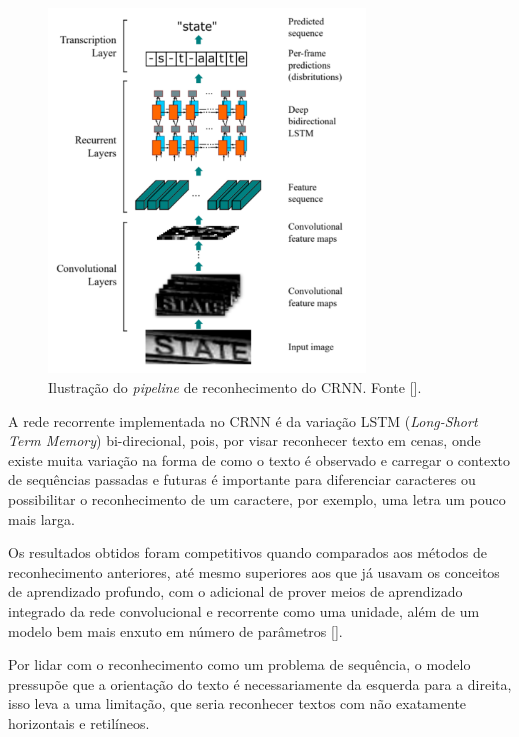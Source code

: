 \begin{figure}
    \centering
    \includegraphics[width=0.75\textwidth]{figs/crnn-pipeline.png}
    \caption{Ilustração do \textit{pipeline} de reconhecimento do CRNN. Fonte [].}
    \label{fig:crnn_pipeline}
\end{figure}

A rede recorrente implementada no CRNN é da variação LSTM (\textit{Long-Short Term Memory}) bi-direcional, pois, por visar reconhecer texto em cenas, 
onde existe muita variação na forma de como o texto é observado e carregar o contexto de sequências passadas e futuras é importante para diferenciar 
caracteres ou possibilitar o reconhecimento de um caractere, por exemplo, uma letra um pouco mais larga.

Os resultados obtidos foram competitivos quando comparados aos métodos de reconhecimento anteriores, até mesmo superiores aos que já usavam 
os conceitos de aprendizado profundo, com o adicional de prover meios de aprendizado integrado da rede convolucional e recorrente como uma unidade, 
além de um modelo bem mais enxuto em número de parâmetros [].

Por lidar com o reconhecimento como um problema de sequência, o modelo pressupõe que a orientação do texto é necessariamente da esquerda para a direita, 
isso leva a uma limitação, que seria reconhecer textos com não exatamente horizontais e retilíneos.

